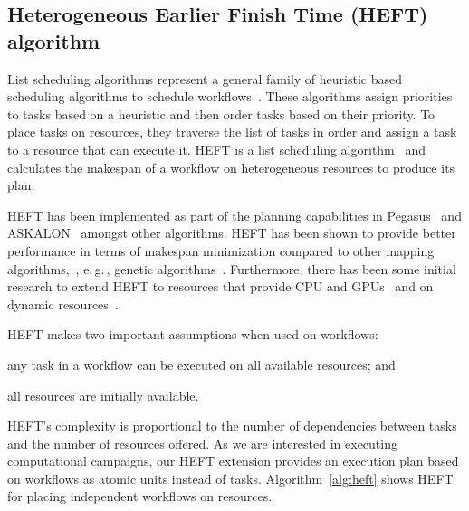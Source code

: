 \subsection{Heterogeneous Earlier Finish Time (HEFT) algorithm}
\label{algo:heft}
List scheduling algorithms represent a general family of heuristic based scheduling algorithms to schedule workflows~\cite{dong2006scheduling,list_sched_wiki}. 
These algorithms assign priorities to tasks based on a heuristic and then order tasks based on their priority.
To place tasks on resources, they traverse the list of tasks in order and assign a task to a resource that can execute it.
HEFT is a list scheduling algorithm~\cite{dong2006scheduling} and calculates the makespan of a workflow on heterogeneous resources to produce its plan.

HEFT has been implemented as part of the planning capabilities in Pegasus~\cite{deelman2015pegasus} and ASKALON~\cite{fahringer2005askalon} amongst other algorithms.
HEFT has been shown to provide better performance in terms of makespan minimization compared to other mapping algorithms,~\cite{topcuoglu2002performance,canon2008comparative}, e.\,g.\,, genetic algorithms~\cite{fahringer2005askalon}. 
Furthermore, there has been some initial research to extend HEFT to resources that provide CPU and GPUs~\cite{shetti2013optimization} and on dynamic resources~\cite{dong2007pfas}. 

HEFT makes two important assumptions when used on workflows: 
\begin{inparaenum}[(1)] 
    \item any task in a workflow can be executed on all available resources; and 
    \item all resources are initially available.
\end{inparaenum}
HEFT's complexity is proportional to the number of dependencies between tasks and the number of resources offered. 
As we are interested in executing computational campaigns, our HEFT extension provides an execution plan based on workflows as atomic units instead of tasks.
Algorithm~\ref{alg:heft} shows HEFT for placing independent workflows on resources.

